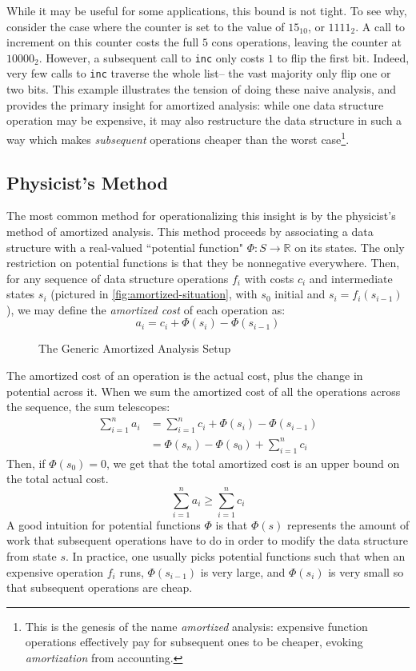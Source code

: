 While it may be useful for some applications, this bound is not tight. To see why, consider the case where the counter is set to the value of $15_{10}$, or $1111_2$. A  call to increment on this counter costs the full $5$ cons operations, leaving the counter at $10000_2$. However, a subsequent call to \texttt{inc} only costs $1$ to flip the first bit. Indeed, very few calls to \texttt{inc} traverse the whole list-- the vast majority only flip one or two bits. This example illustrates the tension of doing these naive analysis, and provides the primary insight for amortized analysis: while one data structure operation may be expensive, it may also restructure the data structure in such a way which makes \textit{subsequent} operations cheaper than the worst case\footnote{
This is the genesis of the name \textit{amortized} analysis: expensive function operations effectively pay for subsequent ones to be cheaper, evoking \textit{amortization} from accounting.
}.

\subsection{Physicist's Method}
The most common method for operationalizing this insight is by the physicist's method of amortized analysis. This method proceeds by associating a data structure with a real-valued ``potential function" $\Phi : S \to \mathbb{R}$ on its states. The only restriction on potential functions is that they be nonnegative everywhere.
Then, for any sequence of data structure operations $f_i$ with costs $c_i$ and intermediate states $s_i$ (pictured in \autoref{fig:amortized-situation}, with $s_0$ initial and $s_i = f_i(s_{i-1})$), we may define the \textit{amortized cost} of each operation as:
$$
a_i = c_i + \Phi(s_i) - \Phi(s_{i-1})
$$

\begin{figure}
  \caption{The Generic Amortized Analysis Setup}
  \label{fig:amortized-situation}
\end{figure}

The amortized cost of an operation is the actual cost, plus the change in potential across it. When we sum the amortized cost of all the operations across the sequence, the sum telescopes:
\begin{align*}
  \sum_{i=1}^n a_i &= \sum_{i=1}^n c_i + \Phi(s_i) - \Phi(s_{i-1})\\
                   &= \Phi(s_n) - \Phi(s_0) + \sum_{i=1}^n c_i
\end{align*}
Then, if $\Phi(s_0) = 0$, we get that the total amortized cost is an upper bound on the total actual cost.
$$
\sum_{i=1}^n a_i \geq \sum_{i=1}^n c_i
$$
A good intuition for potential functions $\Phi$ is that $\Phi(s)$ represents the amount of work that subsequent operations have to do in order to modify the data structure from state $s$.
In practice, one usually picks potential functions such that when an expensive operation $f_i$ runs, $\Phi(s_{i-1})$ is very large, and $\Phi(s_i)$ is very small so that subsequent operations are cheap.

